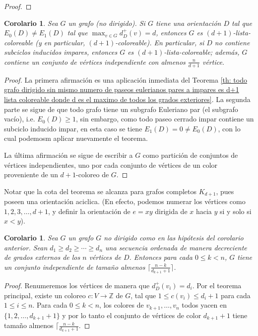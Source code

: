 \documentclass[12pt]{report}
\theoremstyle{plain}
\newtheorem{corollary}[theorem]{Corolario}
\theoremstyle{definition}
\newcommand{\integers}{\mathbb{Z}}
\begin{document}
\begin{proof}
\end{proof}





\begin{corollary}
Sea $G$ un grafo (no dirigido). Si $G$ tiene una orientación $D$ tal que $E_0 (D) \neq E_1 (D)$ tal que $\max_{v \in G} d^+_D (v) = d$, entonces $G$ es $(d+1)$-lista-coloreable (y en particular, $(d+1)$-coloreable). En particular, si $D$ no contiene subciclos inducidos impares, entonces $G$ es $(d+1)$-lista-coloreable; además, $G$ contiene un conjunto de vértices independiente con almenos $\frac n {d+1}$ vértice.
\end{corollary}
\begin{proof}
La primera afirmación es una aplicación inmediata del Teorema \ref{th: todo grafo dirigido sin mismo numero de paseos eulerianos pares a impares es d+1 lista coloreable donde d es el maximo de todos los grados exteriores}. La segunda parte se sigue de que todo grafo tiene un subgrafo Euleriano par (el subgrafo vacío), i.e. $E_0 (D) \geq 1$, sin embargo, como todo paseo cerrado impar contiene un subciclo inducido impar, en esta caso se tiene $E_1 (D) = 0 \neq E_0 (D)$, con lo cual podemosm aplicar nuevamente el teorema.

La última afirmación se sigue de escribir a $G$ como partición de conjuntos de vértices independientes, uno por cada conjunto de vértices de un color proveniente de un ${d+1}$-coloreo de $G$.
\end{proof}

Notar que la cota del teorema se alcanza para grafos completos $K_{d+1}$, pues poseen una orientación aciclica. (En efecto, podemos numerar los vértices como $1,2,3, \ldots, d+1$, y definir la orientación de $e = xy$ dirigida de $x$ hacia $y$ si y solo si $x < y$).

\begin{corollary}
Sea $G$ un grafo $G$ no dirigido como en las hipótesis del corolario anterior. Sean $d_1 \geq d_2 \geq \cdots \geq d_n$ una secuencia ordenada de manera decreciente de grados externos de los $n$ vértices de $D$. Entonces para cada $0 \leq k < n$, $G$ tiene un conjunto independiente de tamaño almenos $\lceil \frac{n-k}{d_{k+1}+1} \rceil$.
\end{corollary}
\begin{proof}
Renumeremos los vértices de manera que $d^+_D (v_i) = d_i$. Por el teorema principal, existe un coloreo $c: V \rightarrow \integers$ de $G$, tal que $1 \leq c(v_i) \leq d_i + 1$ para cada $1 \leq i \leq n$. Para cada $0 \leq k < n$, los colores de $v_{k+1}, \ldots, v_n$ todos yacen en $\{1, 2, \ldots, d_{k+1} + 1 \}$ y por lo tanto el conjunto de vértices de color $d_{k+1} + 1$ tiene tamaño almenos $\lceil \frac{n-k}{d_{k+1} + 1}$.
\end{proof}
\end{document}
